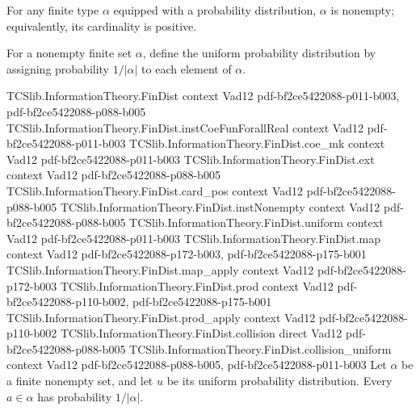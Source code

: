 \begin{theorem}
\label{TCSlib.InformationTheory.FinDist.card_pos}
\leanok
{}
For any finite type $\alpha$ equipped with a probability distribution, $\alpha$ is nonempty;
equivalently, its cardinality is positive.
\end{theorem}

\begin{definition}
\label{TCSlib.InformationTheory.FinDist.uniform}
\leanok
{}
For a nonempty finite set $\alpha$, define the uniform probability distribution by
assigning probability $1/|\alpha|$ to each element of $\alpha$.
\end{definition}

\begin{theorem}
\label{TCSlib.InformationTheory.FinDist.uniform_apply}
\leanok
\proofstep
  {TCSlib.InformationTheory.FinDist}
  {context}
  {Vad12}
  {pdf-bf2ce5422088-p011-b003,
    pdf-bf2ce5422088-p088-b005}
\proofstep
  {TCSlib.InformationTheory.FinDist.instCoeFunForallReal}
  {context}
  {Vad12}
  {pdf-bf2ce5422088-p011-b003}
\proofstep
  {TCSlib.InformationTheory.FinDist.coe_mk}
  {context}
  {Vad12}
  {pdf-bf2ce5422088-p011-b003}
\proofstep
  {TCSlib.InformationTheory.FinDist.ext}
  {context}
  {Vad12}
  {pdf-bf2ce5422088-p088-b005}
\proofstep
  {TCSlib.InformationTheory.FinDist.card_pos}
  {context}
  {Vad12}
  {pdf-bf2ce5422088-p088-b005}
\proofstep
  {TCSlib.InformationTheory.FinDist.instNonempty}
  {context}
  {Vad12}
  {pdf-bf2ce5422088-p088-b005}
\proofstep
  {TCSlib.InformationTheory.FinDist.uniform}
  {context}
  {Vad12}
  {pdf-bf2ce5422088-p011-b003}
\proofstep
  {TCSlib.InformationTheory.FinDist.map}
  {context}
  {Vad12}
  {pdf-bf2ce5422088-p172-b003,
    pdf-bf2ce5422088-p175-b001}
\proofstep
  {TCSlib.InformationTheory.FinDist.map_apply}
  {context}
  {Vad12}
  {pdf-bf2ce5422088-p172-b003}
\proofstep
  {TCSlib.InformationTheory.FinDist.prod}
  {context}
  {Vad12}
  {pdf-bf2ce5422088-p110-b002,
    pdf-bf2ce5422088-p175-b001}
\proofstep
  {TCSlib.InformationTheory.FinDist.prod_apply}
  {context}
  {Vad12}
  {pdf-bf2ce5422088-p110-b002}
\proofstep
  {TCSlib.InformationTheory.FinDist.collision}
  {direct}
  {Vad12}
  {pdf-bf2ce5422088-p088-b005}
\proofstep
  {TCSlib.InformationTheory.FinDist.collision_uniform}
  {context}
  {Vad12}
  {pdf-bf2ce5422088-p088-b005,
    pdf-bf2ce5422088-p011-b003}
Let $\alpha$ be a finite nonempty set, and let $u$ be its uniform probability
distribution. Every $a\in\alpha$ has probability $1/|\alpha|$.
\end{theorem}

